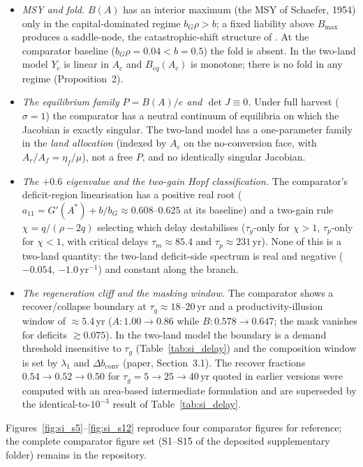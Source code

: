 \documentclass[11pt,a4paper]{article}
\newcommand{\dconv}{\Delta b_{\mathrm{conv}}}
\begin{document}
\begin{itemize}[leftmargin=1.5em]
\item \emph{MSY and fold.} $B(A)$ has an interior maximum (the MSY of Schaefer, 1954) only in the capital-dominated regime $b_G\rho>b$; a fixed liability above $B_{\max}$ produces a saddle-node, the catastrophic-shift structure of \citet{Scheffer2001}. At the comparator baseline ($b_G\rho=0.04<b=0.5$) the fold is absent. In the two-land model $Y_c$ is linear in $A_c$ and $B_{eq}(A_c)$ is monotone; there is no fold in any regime (Proposition~2).
\item \emph{The equilibrium family $P=B(A)/e$ and $\det J\equiv0$.} Under full harvest ($\sigma=1$) the comparator has a neutral continuum of equilibria on which the Jacobian is exactly singular. The two-land model has a one-parameter family in the \emph{land allocation} (indexed by $A_c$ on the no-conversion face, with $A_r/A_f=\eta_f/\mu$), not a free $P$, and no identically singular Jacobian.
\item \emph{The $+0.6$ eigenvalue and the two-gain Hopf classification.} The comparator's deficit-region linearisation has a positive real root ($a_{11}=G'(A^*)+b/b_G\approx0.608$--$0.625$ at its baseline) and a two-gain rule $\chi=q/(\rho-2q)$ selecting which delay destabilises ($\tau_g$-only for $\chi>1$, $\tau_p$-only for $\chi<1$, with critical delays $\tau_m\approx85.4$ and $\tau_p\approx231$\,yr). None of this is a two-land quantity: the two-land deficit-side spectrum is real and negative ($-0.054$, $-1.0\,\mathrm{yr}^{-1}$) and constant along the branch.
\item \emph{The regeneration cliff and the masking window.} The comparator shows a recover/collapse boundary at $\tau_g\approx18$--$20$\,yr and a productivity-illusion window of $\approx5.4$\,yr ($A:1.00\to0.86$ while $B:0.578\to0.647$; the mask vanishes for deficits $\gtrsim0.075$). In the two-land model the boundary is a demand threshold insensitive to $\tau_g$ (Table~\ref{tab:si_delay}) and the composition window is set by $\lambda_1$ and $\dconv$ (paper, Section~3.1). The recover fractions $0.54\to0.52\to0.50$ for $\tau_g=5\to25\to40$\,yr quoted in earlier versions were computed with an area-based intermediate formulation and are superseded by the identical-to-$10^{-3}$ result of Table~\ref{tab:si_delay}.
\end{itemize}
Figures~\ref{fig:si_s5}--\ref{fig:si_s12} reproduce four comparator figures for reference; the complete comparator figure set (S1--S15 of the deposited supplementary folder) remains in the repository.
\end{document}
